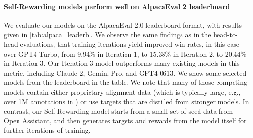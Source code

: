 \documentclass{article}
\begin{document}
\paragraph{Self-Rewarding models perform well on AlpacaEval 2 leaderboard}
We evaluate our models on the AlpacaEval 2.0 leaderboard format, with results given in 
\autoref{tab:alpaca_leaderb}. We observe the same findings as in the head-to-head evaluations, that training iterations yield improved win rates, in this case over GPT4-Turbo, from 9.94\% in Iteration 1, to 15.38\% in Iteration 2, to 20.44\% in Iteration 3. Our Iteration 3 model outperforms many existing models in this metric, including Claude 2, Gemini Pro, and GPT4 0613. We show some selected models from the leaderboard in the table. We note that many of those competing models contain either proprietary alignment data (which is typically large, e.g., over 1M annotations in \citet{touvron2023llama2}) or use targets that are distilled from stronger models. In contrast, our Self-Rewarding model  starts from a small set of seed data from Open Assistant, and then generates targets and rewards from the model itself for further iterations of  training. 
\end{document}
